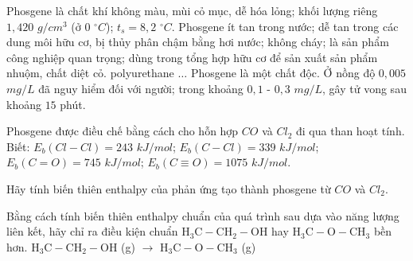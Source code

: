\documentclass[Main.tex]{subfiles}
\begin{document}
\begin{bt}
	Phosgene là chất khí không màu, mùi cỏ mục, dễ hóa lỏng; khối lượng riêng $1{,}420$ $g/cm^3$ (ở $0$ $^\circ C$); $t_s = 8{,}2$ $^\circ C$. Phosgene ít tan trong nước; dễ tan trong các dung môi hữu cơ, bị thủy phân chậm bằng hơi nước; không cháy; là sản phẩm công nghiệp quan trọng; dùng trong tổng hợp hữu cơ để sản xuất sản phẩm nhuộm, chất diệt cỏ. polyurethane $\ldots$ Phosgene là một chất độc. Ở nồng độ $0{,}005$ $mg/L$ đã nguy hiểm đối với người; trong khoảng $0{,}1$ - $0{,}3$ $mg/L$, gây tử vong sau khoảng $15$ phút.
	
	Phosgene được điều chế bằng cách cho hỗn hợp $CO$ và $Cl_2$ đi qua than hoạt tính. Biết: $E_b(Cl-Cl) = 243$ $kJ/mol$; $E_b(C-Cl)= 339$ $kJ/mol$; $E_b(C=O) = 745$ $kJ/mol$; $E_b(C\equiv O) = 1075$ $kJ/mol$.
	
	Hãy tính biến thiên enthalpy của phản ứng tạo thành phosgene từ $CO$ và $Cl_2$.
\end{bt}
\begin{bt}
	Bằng cách tính biến thiên enthalpy chuẩn của quá trình sau dựa vào năng lượng liên kết, hãy chỉ ra điều kiện chuẩn $\mathrm{H_3C-CH_2-OH}$ hay $\mathrm{H_3C-O-CH_3}$ bền hơn.
	$\mathrm{H_3C-CH_2-OH}$ (g) $\rightarrow$ $\mathrm{H_3C-O-CH_3}$ (g)
\end{bt}
\end{document}
